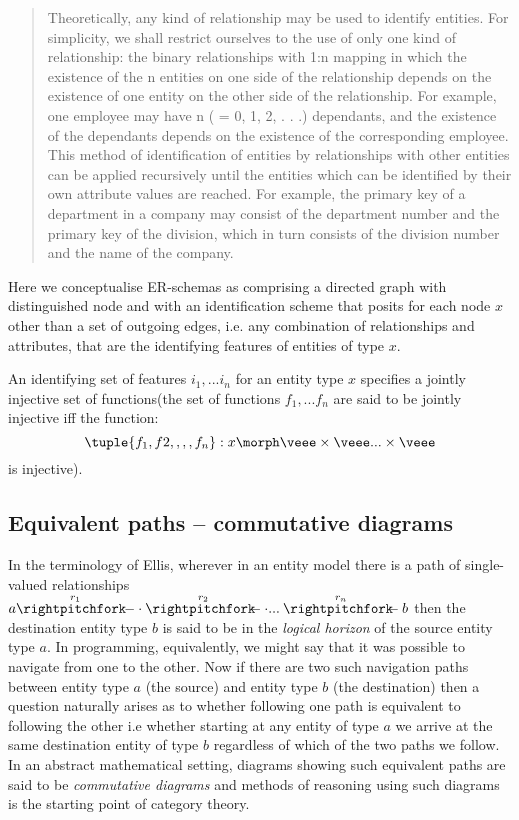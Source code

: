 \begin{quote}
Theoretically, any kind of relationship may be used to identify entities. For
simplicity, we shall restrict ourselves to the use of only one kind of relationship:
the binary relationships with 1:n mapping in which the existence of the n entities
on one side of the relationship depends on the existence of one entity on the other
side of the relationship. For example, one employee may have n ( = 0, 1, 2, . . .)
dependants, and the existence of the dependants depends on the existence of the
corresponding employee.
This method of identification of entities by relationships with other entities can
be applied recursively until the entities which can be identified by their own attribute
values are reached. For example, the primary key of a department in a
company may consist of the department number and the primary key of the
division, which in turn consists of the division number and the name of the company.
\end{quote}


Here we conceptualise ER-schemas as comprising a directed graph with distinguished 
node \veee and with an identification scheme that posits for each node $x$ other than \veee
a set of outgoing edges, i.e. any combination of relationships and attributes, that are
the identifying features of entities of type $x$.

An identifying set of features  $i_1,...i_n$ for an entity type $x$ specifies a jointly injective set of functions(the set of functions $f_1,...f_n$ are said to be jointly injective iff the function:
$$
\tuple{f_1,f2,,,,f_n}: x \morph \veee \times \veee ... \times \veee
$$
is injective).


\subsection{Equivalent paths -- commutative diagrams}
In the terminology of Ellis\cite{ellis1982}, wherever in an entity model there is a path of single-valued relationships 
$\overset{r_1}{a \rightpitchfork \hspace{-0.35em} -  \cdot} \overset{r_2}{\rightpitchfork \hspace{-0.35em} -} \cdot ... \overset{r_n}{\rightpitchfork \hspace{-0.35em} -} b$
then the destination entity type $b$ is said to be in the \textit{logical horizon}  of the source entity type $a$. In programming, equivalently, 
we might say that it was possible to navigate from one to the other. Now if there are two such navigation paths between entity type $a$ (the source) and entity type $b$ (the destination) then a question naturally arises as to whether following one path is equivalent to
following the other i.e whether starting at any entity of type $a$ we arrive at the same destination entity of type $b$ regardless of which of the two paths we follow. In an abstract mathematical setting, diagrams showing such equivalent
paths are said to be \textit{commutative diagrams} and methods of reasoning using such diagrams is the starting point of category theory. 

